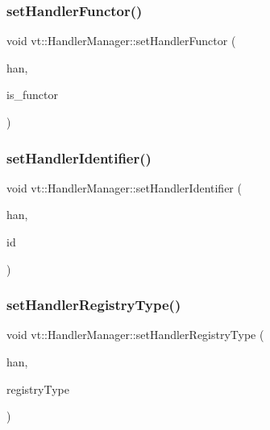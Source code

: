 \subsubsection{\texorpdfstring{set\+Handler\+Functor()}{setHandlerFunctor()}}
{\footnotesize\ttfamily void vt\+::\+Handler\+Manager\+::set\+Handler\+Functor (\begin{DoxyParamCaption}\item[{\hyperlink{namespacevt_af64846b57dfcaf104da3ef6967917573}{Handler\+Type} \&}]{han,  }\item[{bool}]{is\+\_\+functor }\end{DoxyParamCaption})\hspace{0.3cm}{\ttfamily [static]}}

\mbox{\label{structvt_1_1_handler_manager_a5501e67dbd88836fecdf434548de0909}} 
\subsubsection{\texorpdfstring{set\+Handler\+Identifier()}{setHandlerIdentifier()}}
{\footnotesize\ttfamily void vt\+::\+Handler\+Manager\+::set\+Handler\+Identifier (\begin{DoxyParamCaption}\item[{\hyperlink{namespacevt_af64846b57dfcaf104da3ef6967917573}{Handler\+Type} \&}]{han,  }\item[{\hyperlink{namespacevt_a59ae068fe828d1c33051ff96f3d016b6}{Handler\+Identifier\+Type}}]{id }\end{DoxyParamCaption})\hspace{0.3cm}{\ttfamily [static]}}

\mbox{\label{structvt_1_1_handler_manager_a2a5f58fcd6fa2b9bdda6b72b59597801}} 
\subsubsection{\texorpdfstring{set\+Handler\+Registry\+Type()}{setHandlerRegistryType()}}
{\footnotesize\ttfamily void vt\+::\+Handler\+Manager\+::set\+Handler\+Registry\+Type (\begin{DoxyParamCaption}\item[{\hyperlink{namespacevt_af64846b57dfcaf104da3ef6967917573}{Handler\+Type} \&}]{han,  }\item[{\hyperlink{namespacevt_1_1auto__registry_a9f369ca2b484130b396729e2ddf05241}{Registry\+Type\+Enum}}]{registry\+Type }\end{DoxyParamCaption})\hspace{0.3cm}{\ttfamily [static]}}



